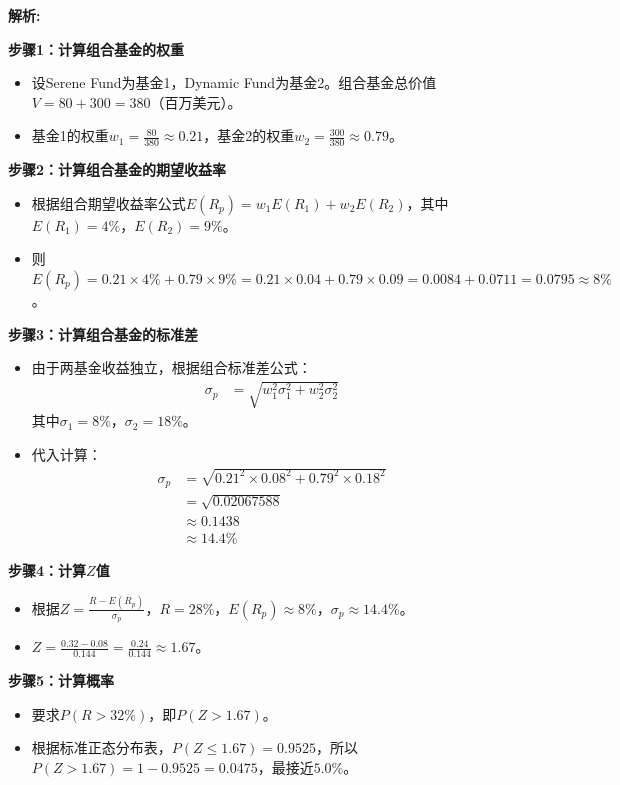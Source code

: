 \documentclass{article}
\newenvironment{explanation}
{\textbf{解析:}\par}
{\par}
\begin{document}
    \begin{explanation}
    \textbf{步骤1：计算组合基金的权重}
    \begin{itemize}
    \item 设Serene Fund为基金1，Dynamic Fund为基金2。组合基金总价值\(V=80 + 300=380\)（百万美元）。
    \item 基金1的权重\(w_1=\frac{80}{380}\approx0.21\)，基金2的权重\(w_2=\frac{300}{380}\approx0.79\)。
    \end{itemize}
    \textbf{步骤2：计算组合基金的期望收益率}
    \begin{itemize}
    \item 根据组合期望收益率公式\(E(R_p)=w_1E(R_1)+w_2E(R_2)\)，其中\(E(R_1) = 4\%\)，\(E(R_2)=9\%\)。
    \item 则\(E(R_p)=0.21\times4\%+0.79\times9\%=0.21\times0.04 + 0.79\times0.09=0.0084+0.0711 = 0.0795\approx8\%\)。
    \end{itemize}
    \textbf{步骤3：计算组合基金的标准差}
    \begin{itemize}
        \item 由于两基金收益独立，根据组合标准差公式：
        \begin{align*}
        \sigma_p &= \sqrt{w_1^{2}\sigma_1^{2}+w_2^{2}\sigma_2^{2}}
        \end{align*}
        其中\(\sigma_1 = 8\%\)，\(\sigma_2=18\%\)。
        
        \item 代入计算：
        \begin{align*}
        \sigma_p &= \sqrt{0.21^{2}\times0.08^{2}+0.79^{2}\times0.18^{2}} \\
                 &= \sqrt{0.02067588} \\
                 &\approx 0.1438 \\
                 &\approx 14.4\%
        \end{align*}
        \end{itemize}
    \textbf{步骤4：计算\(Z\)值}
    \begin{itemize}
    \item 根据\(Z=\frac{R - E(R_p)}{\sigma_p}\)，\(R = 28\%\)，\(E(R_p)\approx8\%\)，\(\sigma_p\approx14.4\%\)。
    \item \(Z=\frac{0.32 - 0.08}{0.144}=\frac{0.24}{0.144}\approx1.67\)。
    \end{itemize}
    \textbf{步骤5：计算概率}
    \begin{itemize}
    \item 要求\(P(R>32\%)\)，即\(P(Z > 1.67)\)。
    \item 根据标准正态分布表，\(P(Z\leq1.67)=0.9525\)，所以\(P(Z > 1.67)=1 - 0.9525 = 0.0475\)，最接近\(5.0\%\)。
    \end{itemize}
    \end{explanation}
    
\end{document}
